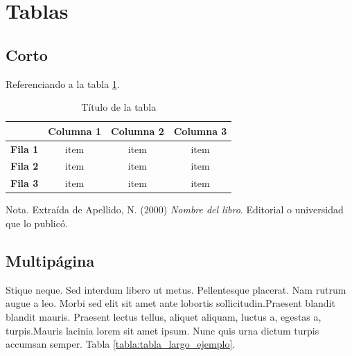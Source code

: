 \section{Tablas}

\subsection{Corto}
Referenciando a la tabla \ref{tabla:ejemplo}.\\

\begin{table}[H]
    \caption{Título de la tabla}
    \label{tabla:ejemplo}
    \begin{center}
        \begin{tabular}{c|c|c|c|}
            \cline{2-4}
            & \textbf{Columna 1} & \textbf{Columna 2} & \textbf{Columna 3} \\ \hline
            \multicolumn{1}{|c|}{\textbf{Fila 1}} & item               & item               & item               \\ \hline
            \multicolumn{1}{|c|}{\textbf{Fila 2}} & item               & item               & item               \\ \hline
            \multicolumn{1}{|c|}{\textbf{Fila 3}} & item               & item               & item               \\ \hline
        \end{tabular}
    \end{center}
    Nota. Extraída de Apellido, N. (2000) \textit{Nombre del libro}.
    Editorial o universidad que lo publicó.
\end{table}

\subsection{Multipágina}
Stique neque. Sed interdum libero ut metus.
Pellentesque placerat. Nam rutrum augue a leo. Morbi sed 
elit sit amet ante lobortis sollicitudin.Praesent blandit 
blandit mauris. Praesent lectus tellus, aliquet aliquam,
luctus a, egestas a, turpis.Mauris lacinia lorem sit amet
ipsum. Nunc quis urna dictum turpis accumsan semper. Tabla
\ref{tabla:tabla_largo_ejemplo}.\\

